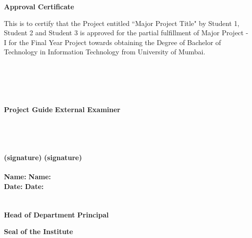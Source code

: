 \newpage
\thispagestyle{empty}
\vspace*{0.2cm}
\vspace{1cm}
\begin{center}
 \large\textbf{Approval Certificate}
\end{center}
\vspace{2cm}
This is to certify that the Project entitled ``Major Project Title" by Student 1, Student 2 and Student 3 is approved  for the partial fulfillment of Major Project - I for the Final Year Project towards obtaining the Degree of Bachelor of Technology in Information Technology from University of Mumbai.\\
\\
\\
\\
\\
\\
\textbf{Project Guide} \hspace{3.5in} \textbf{External Examiner}\\ 
\\
\\
\\
\\
\textbf {(signature)} \hspace{3.75in} \textbf{(signature)} \\
\\
\vspace{1cm}
\textbf {Name:} \hspace{4.1in} \textbf{Name:}\\ 
\vspace{1cm}
\textbf {Date:} \hspace{4.2in} \textbf{Date:}\\ 
\vspace{1cm}
\\
\\
\textbf {Head of Department} \hspace{3in} \textbf{Principal}\\ 
\vspace{2cm}
\begin{center}
\textbf{Seal of the Institute}\\
\end{center}

